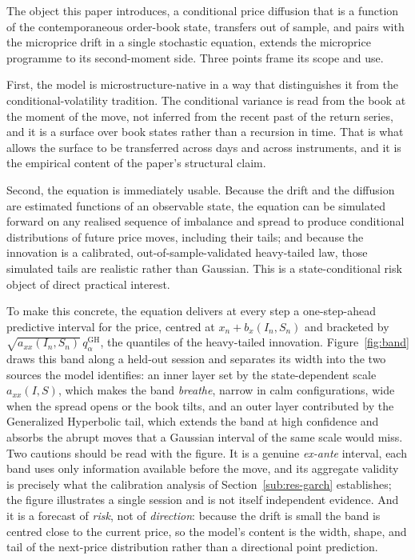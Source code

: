 \documentclass[11pt]{article}
\theoremstyle{plain}
\theoremstyle{definition}
\newcommand{\GH}{\mathrm{GH}}
\newcommand{\axx}{a_{xx}}
\begin{document}
The object this paper introduces, a conditional price diffusion that is a function of
the contemporaneous order-book state, transfers out of sample, and pairs with the
microprice drift in a single stochastic equation, extends the microprice programme
to its second-moment side. Three points frame its scope and use.

First, the model is microstructure-native in a way that distinguishes it from the
conditional-volatility tradition. The conditional variance is read from the book at
the moment of the move, not inferred from the recent past of the return series, and it
is a surface over book states rather than a recursion in time. That is what allows the
surface to be transferred across days and across instruments, and it is the empirical
content of the paper's structural claim.

Second, the equation is immediately usable. Because the drift and the diffusion are
estimated functions of an observable state, the equation can be simulated forward on
any realised sequence of imbalance and spread to produce conditional distributions of
future price moves, including their tails; and because the innovation is a calibrated,
out-of-sample-validated heavy-tailed law, those simulated tails are realistic rather
than Gaussian. This is a state-conditional risk object of direct practical interest.

To make this concrete, the equation delivers at every step a one-step-ahead predictive
interval for the price, centred at $x_n+b_x(I_n,S_n)$ and bracketed by
$\sqrt{\axx(I_n,S_n)}\,q^{\GH}_{\alpha}$, the quantiles of the heavy-tailed innovation.
Figure~\ref{fig:band} draws this band along a held-out session and separates its width
into the two sources the model identifies: an inner layer set by the state-dependent
scale $\axx(I,S)$, which makes the band \emph{breathe}, narrow in calm configurations,
wide when the spread opens or the book tilts, and an outer layer contributed by the
Generalized Hyperbolic tail, which extends the band at high confidence and absorbs the
abrupt moves that a Gaussian interval of the same scale would miss. Two cautions should
be read with the figure. It is a genuine \emph{ex-ante} interval, each band uses only
information available before the move, and its aggregate validity is precisely what the
calibration analysis of Section~\ref{sub:res-garch} establishes; the figure illustrates a
single session and is not itself independent evidence. And it is a forecast of
\emph{risk}, not of \emph{direction}: because the drift is small the band is centred close
to the current price, so the model's content is the width, shape, and tail of the
next-price distribution rather than a directional point prediction.
\end{document}
